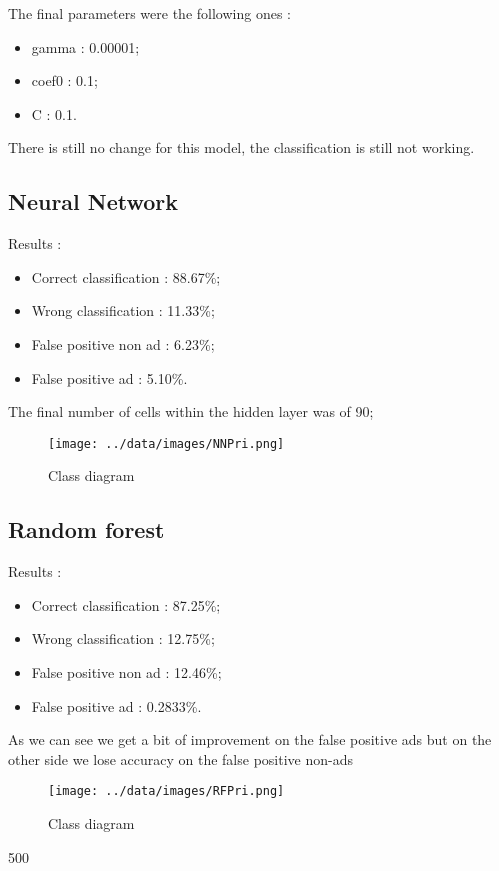 The final parameters were the following ones :
\begin{itemize}
  \item gamma : 0.00001;
  \item coef0 : 0.1;
  \item C : 0.1.
\end{itemize}

There is still no change for this model, the classification is still not working.

\subsection{Neural Network}


  Results :
  \begin{itemize}
    \item Correct classification : 88.67\%;
    \item Wrong classification : 11.33\%;
    \item False positive non ad : 6.23\%;
    \item False positive ad : 5.10\%.
  \end{itemize}

The final number of cells within the hidden layer was of 90;

  \begin{figure}[h]
   \centering
   \texttt{[image: ../data/images/NNPri.png]}
   \caption{Class diagram}
  \end{figure}

\subsection{Random forest}

Results :
\begin{itemize}
  \item Correct classification : 87.25\%;
  \item Wrong classification : 12.75\%;
  \item False positive non ad : 12.46\%;
  \item False positive ad : 0.2833\%.
\end{itemize}

As we can see we get a bit of improvement on the false positive ads but on the other side we lose accuracy on the false positive non-ads 
\begin{figure}[h]
 \centering
 \texttt{[image: ../data/images/RFPri.png]}
 \caption{Class diagram}
\end{figure}
500
